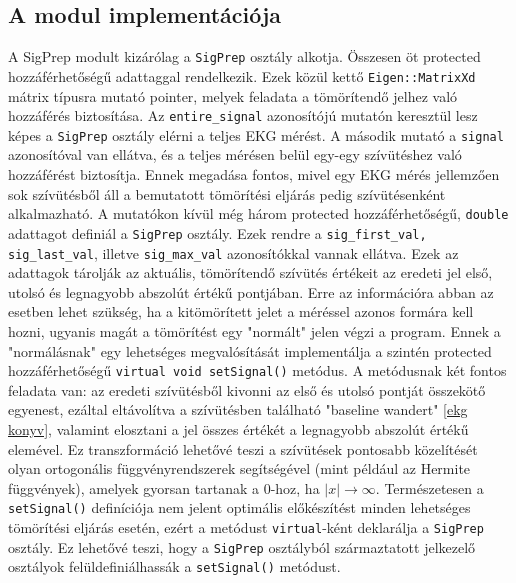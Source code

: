 \documentclass[oneside,titlepage,12pt,a4paper]{report}
\begin{document}
\subsection*{A modul implementációja}

\par A SigPrep modult kizárólag a \texttt{SigPrep} osztály alkotja. Összesen öt protected hozzáférhetőségű adattaggal rendelkezik. Ezek közül kettő \texttt{Eigen::MatrixXd} mátrix típusra mutató pointer, melyek feladata a tömörítendő jelhez való hozzáférés biztosítása. Az \texttt{entire\_signal} azonosítójú mutatón keresztül lesz képes a \texttt{SigPrep} osztály elérni a teljes EKG mérést. A második mutató a \texttt{signal} azonosítóval van ellátva, és a teljes mérésen belül egy-egy szívütéshez való hozzáférést biztosítja. Ennek megadása fontos, mivel egy EKG mérés jellemzően sok szívütésből áll a bemutatott tömörítési eljárás pedig szívütésenként alkalmazható. A mutatókon kívül még három protected hozzáférhetőségű, \texttt{double} adattagot definiál a \texttt{SigPrep} osztály. Ezek rendre a \texttt{sig\_first\_val, sig\_last\_val}, illetve \texttt{sig\_max\_val} azonosítókkal vannak ellátva. Ezek az adattagok tárolják az aktuális, tömörítendő szívütés értékeit az eredeti jel első, utolsó és legnagyobb abszolút értékű pontjában. Erre az információra abban az esetben lehet szükség, ha a kitömörített jelet a méréssel azonos formára kell hozni, ugyanis magát a tömörítést egy "normált" jelen végzi a program. Ennek a "normálásnak" egy lehetséges megvalósítását implementálja a szintén protected hozzáférhetőségű \texttt{virtual void setSignal()} metódus. A metódusnak két fontos feladata van: az eredeti szívütésből kivonni az első és utolsó pontját összekötő egyenest, ezáltal eltávolítva a szívütésben található "baseline wandert" \ref{ekg konyv}, valamint elosztani a jel összes értékét a legnagyobb abszolút értékű elemével. Ez transzformáció lehetővé teszi a szívütések pontosabb közelítését olyan ortogonális függvényrendszerek segítségével (mint például az Hermite függvények), amelyek gyorsan tartanak a 0-hoz, ha $|x| \to \infty$. Természetesen a \texttt{setSignal()} definíciója nem jelent optimális előkészítést minden lehetséges tömörítési eljárás esetén, ezért a metódust \texttt{virtual}-ként deklarálja a \texttt{SigPrep} osztály. Ez lehetővé teszi, hogy a \texttt{SigPrep} osztályból származtatott jelkezelő osztályok felüldefiniálhassák a \texttt{setSignal()} metódust. 
\end{document}

